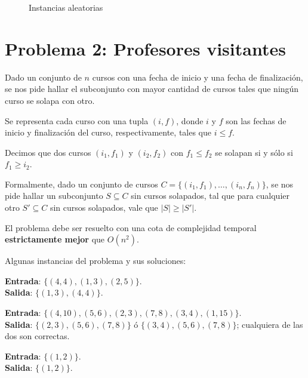 \documentclass[a4paper, 10pt, twoside]{article}
\newcommand{\tresgraficos}[3]{
    \newcommand{\separacion}{-2.2em}
    \vspace{\separacion}
    
    \vspace{\separacion}
    
    \vspace{\separacion}
    
}
\begin{document}
\begin{figure}[H]
  \centering
  \tresgraficos{problema1-instancias-aleatorias}
               {problema1-instancias-aleatorias-logn}
               {problema1-instancias-aleatorias-n}
  \caption{Instancias aleatorias}
\end{figure}




\newpage

\section{Problema 2: Profesores visitantes}

Dado un conjunto de $n$ cursos con una fecha de inicio y una fecha de finalización, se nos pide hallar el subconjunto con mayor cantidad de cursos tales que ningún curso se solapa con otro.

Se representa cada curso con una tupla $(i, f)$, donde $i$ y $f$ son las fechas de inicio y finalización del curso, respectivamente, tales que $i \leq f$.

Decimos que dos cursos $(i_1, f_1)$ y $(i_2, f_2)$ con $f_1 \leq f_2$ se solapan si y sólo si $f_1 \geq i_2$.

Formalmente, dado un conjunto de cursos $C = \{ (i_1, f_1), \ldots, (i_n, f_n) \}$, se nos pide hallar un subconjunto $S \subseteq C$ sin cursos solapados, tal que para cualquier otro $S' \subseteq C$ sin cursos solapados, vale que $|S| \geq |S'|$.

El problema debe ser resuelto con una cota de complejidad temporal \textbf{estrictamente mejor} que $O(n^2)$.

Algunas instancias del problema y sus soluciones:

\textbf{Entrada}: $\{(4, 4), (1, 3), (2, 5)\}$.\\
\textbf{Salida}: $\{(1, 3), (4, 4)\}$.

\textbf{Entrada}: $\{(4, 10), (5, 6), (2, 3), (7, 8), (3, 4), (1, 15)\}$.\\
\textbf{Salida}: $\{(2, 3), (5, 6), (7, 8)\}$ ó $\{(3, 4), (5, 6), (7, 8)\}$; cualquiera de las dos son correctas.

\textbf{Entrada}: $\{(1, 2)\}$.\\
\textbf{Salida}: $\{(1, 2)\}$.
\end{document}

